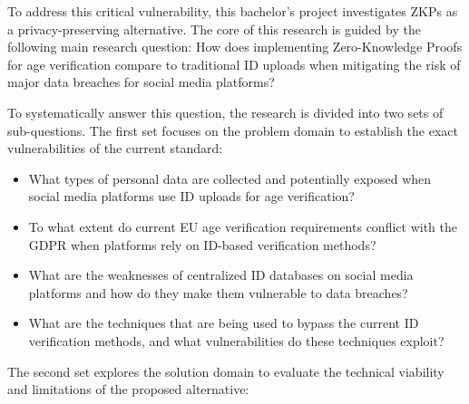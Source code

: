\documentclass [english]{hogent-article}
\begin{document}
    
    
    To address this critical vulnerability, this bachelor's project investigates ZKPs as a privacy-preserving alternative. The core of this research is guided by the following main research question: How does implementing Zero-Knowledge Proofs for age verification compare to traditional ID uploads when mitigating the risk of major data breaches for social media platforms?
    
    
    
    To systematically answer this question, the research is divided into two sets of sub-questions. The first set focuses on the problem domain to establish the exact vulnerabilities of the current standard:
    
    \begin{itemize} 
        
        \item What types of personal data are collected and potentially exposed when social media platforms use ID uploads for age verification? 
        
        \item To what extent do current EU age verification requirements conflict with the GDPR when platforms rely on ID-based verification methods? 
        
        \item What are the weaknesses of centralized ID databases on social media platforms and how do they make them vulnerable to data breaches? 
        
        \item What are the techniques that are being used to bypass the current ID verification methods, and what vulnerabilities do these techniques exploit? 
        
    \end{itemize}
    
    
    
    The second set explores the solution domain to evaluate the technical viability and limitations of the proposed alternative:
    
\end{document}
